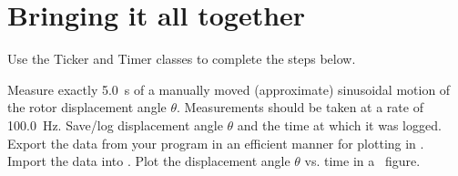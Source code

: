 \documentclass{exam}
\begin{document}
\section{Bringing it all together}
Use the Ticker and Timer classes to complete the steps below.
\begin{questions}
\question Measure exactly \SI{5.0}{\second} of a manually moved (approximate) sinusoidal motion of the rotor displacement angle $\theta$.
\question Measurements should be taken at a rate of \SI{100.0}{\hertz}. 
\question Save/log displacement angle $\theta$ and the time at which it was logged. 
\question Export the data from your program in an efficient manner for plotting in \Matlab. 
\question Import the data into \Matlab. 
\question Plot the displacement angle $\theta$ vs. time in a \Matlab\ figure. 
\end{questions}
\end{document}
